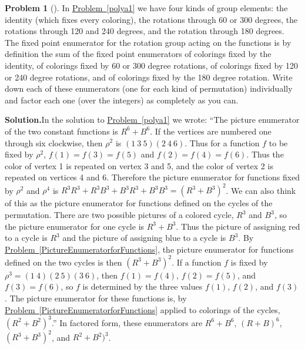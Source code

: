 \documentclass[10pt,]{book}
\theoremstyle{plain}
\theoremstyle{definition}
\newtheorem{activity}[project]{Problem}
\theoremstyle{definition}
\numberwithin{equation}{chapter}
\begin{document}
\begin{activity}[]\label{polya3}
In \hyperref[polya1]{Problem~\ref{polya1}} we have four kinds of group elements: the identity (which fixes every coloring), the rotations through 60 or 300 degrees, the rotations through 120 and 240 degrees, and the rotation through 180 degrees. The fixed point enumerator for the rotation group acting on the functions is by definition the sum of the fixed point enumerators of colorings fixed by the identity, of colorings fixed by 60 or 300 degree rotations, of colorings fixed by 120 or 240 degree rotations, and of colorings fixed by the 180 degree rotation. Write down each of these enumerators (one for each kind of permutation) individually and factor each one (over the integers) as completely as you can.%
\par\medskip\noindent%
\textbf{Solution.}\quad In the solution to \hyperref[polya1]{Problem~\ref{polya1}} we wrote: ``The picture enumerator of the two constant functions is \(R^6+B^6\). If the vertices are numbered one through six clockwise, then \(\rho^2\) is \((1\ 3\ 5)(2\ 4\ 6)\). Thus for a function \(f\) to be fixed by \(\rho^2\), \(f(1)=f(3)=f(5)\) and \(f(2)=f(4)=f(6)\). Thus the color of vertex 1 is repeated on vertex 3 and 5, and the color of vertex 2 is repeated on vertices 4 and 6. Therefore the picture enumerator for functions fixed by \(\rho^2\) and \(\rho^4\) is \(R^3R^3 +R^3B^3+B^3R^3 +B^3B^3=(R^3+B^3)^2\). We can also think of this as the picture enumerator for functions defined on the cycles of the permutation. There are two possible pictures of a colored cycle, \(R^3\) and \(B^3\), so the picture enumerator for one cycle is \(R^3+B^3\). Thus the picture of assigning red to a cycle is \(R^3\) and the picture of assigning blue to a cycle is \(B^3\). By \hyperref[PictureEnumeratorforFunctions]{Problem~\ref{PictureEnumeratorforFunctions}}, the picture enumerator for functions defined on the two cycles is then \((R^3+B^3)^2\). If a function \(f\) is fixed by \(\rho^3=(1\ 4)(2\ 5)(3\ 6)\), then \(f(1)=f(4)\), \(f(2)=f(5)\), and \(f(3)=f(6)\), so \(f\) is determined by the three values \(f(1)\), \(f(2)\), and \(f(3)\). The picture enumerator for these functions is, by \hyperref[PictureEnumeratorforFunctions]{Problem~\ref{PictureEnumeratorforFunctions}} applied to colorings of the cycles, \((R^2+B^2)^3\).'' In factored form, these enumerators are \(R^6+B^6\), \((R+B)^6\), \((R^3+B^3)^2\), and \(R^2+B^2)^3\).%
\end{activity}
\end{document}
